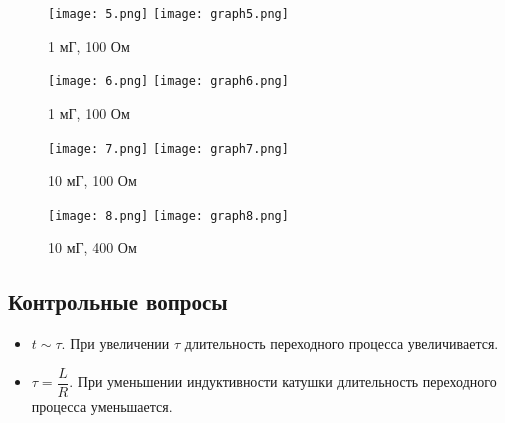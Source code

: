 \documentclass[a4paper,14pt]{article}
\begin{document}
\begin{figure}[H]
	\centering
	\texttt{[image: 5.png]}
	\texttt{[image: graph5.png]}
	\caption{1 мГ, 100 Ом}	
\end{figure}

\begin{figure}[H]
	\centering
	\texttt{[image: 6.png]}
	\texttt{[image: graph6.png]}
	\caption{1 мГ, 100 Ом}	
\end{figure}

\begin{figure}[H]
	\centering
	\texttt{[image: 7.png]}
	\texttt{[image: graph7.png]}
	\caption{10 мГ, 100 Ом}	
\end{figure}

\begin{figure}[H]
	\centering
	\texttt{[image: 8.png]}
	\texttt{[image: graph8.png]}
	\caption{10 мГ, 400 Ом}	
\end{figure}

\subsection{Контрольные вопросы}
\begin{itemize}
	\item $t \sim \tau.$ При увеличении $\tau$ длительность переходного процесса увеличивается.
	\item $\tau = \dfrac{L}{R}$. При уменьшении индуктивности катушки длительность переходного процесса уменьшается.
\end{itemize}
\end{document}
